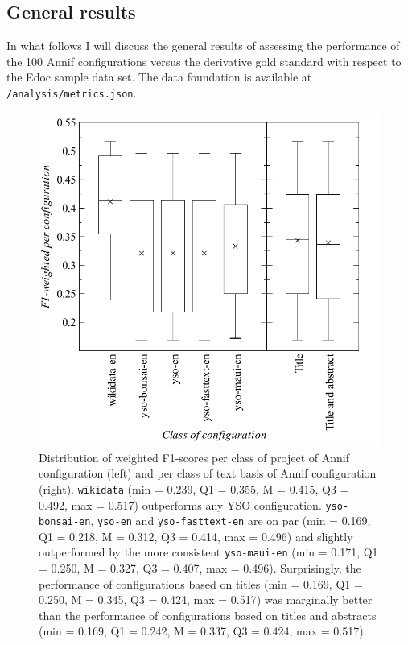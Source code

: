 \hypertarget{general-results}{%
\subsection{General results}\label{general-results}}

In what follows I will discuss the general results of assessing the
performance of the 100 Annif configurations versus the derivative gold
standard with respect to the Edoc sample data set. The data foundation
is available at \texttt{/analysis/metrics.json}.

\begin{figure}
\centering
\includegraphics{images/metrics_all_project+abstract.pdf}
\caption{Distribution of weighted F1-scores per class of project of
Annif configuration (left) and per class of text basis of Annif
configuration (right). \texttt{wikidata} (min = 0.239, Q1 = 0.355, M =
0.415, Q3 = 0.492, max = 0.517) outperforms any YSO configuration.
\texttt{yso-bonsai-en}, \texttt{yso-en} and \texttt{yso-fasttext-en} are
on par (min = 0.169, Q1 = 0.218, M = 0.312, Q3 = 0.414, max = 0.496) and
slightly outperformed by the more consistent \texttt{yso-maui-en} (min =
0.171, Q1 = 0.250, M = 0.327, Q3 = 0.407, max = 0.496). Surprisingly,
the performance of configurations based on titles (min = 0.169, Q1 =
0.250, M = 0.345, Q3 = 0.424, max = 0.517) was marginally better than
the performance of configurations based on titles and abstracts (min =
0.169, Q1 = 0.242, M = 0.337, Q3 = 0.424, max = 0.517).}
\end{figure}

